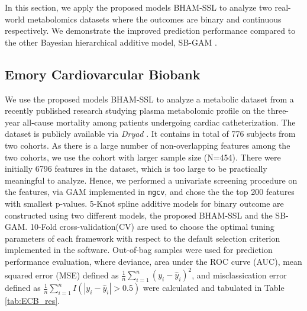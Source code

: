 \documentclass[AMA,STIX1COL,]{WileyNJD-v2}
\begin{document}
\label{sec:real_data}

In this section, we apply the proposed models BHAM-SSL to analyze two
real-world metabolomics datasets where the outcomes are binary and
continuous respectively. We demonstrate the improved prediction
performance compared to the other Bayesian hierarchical additive model,
SB-GAM \citep{Bai2021}.

\hypertarget{emory-cardiovarcular-biobank}{%
\subsection{Emory Cardiovarcular
Biobank}\label{emory-cardiovarcular-biobank}}

We use the proposed models BHAM-SSL to analyze a metabolic dataset from
a recently published research \citep{Mehta2020} studying plasma
metabolomic profile on the three-year all-cause mortality among patients
undergoing cardiac catheterization. The dataset is publicly available
via \textit{Dryad} \citep{Mehta2020_data}. It contains in total of 776
subjects from two cohorts. As there is a large number of non-overlapping
features among the two cohorts, we use the cohort with larger sample
size (N=454). There were initially 6796 features in the dataset, which
is too large to be practically meaningful to analyze. Hence, we
performed a univariate screening procedure on the features, via GAM
implemented in \texttt{mgcv}, and chose the the top 200 features with
smallest p-values. 5-Knot spline additive models for binary outcome are
constructed using two different models, the proposed BHAM-SSL and the
SB-GAM. 10-Fold cross-validation(CV) are used to choose the optimal
tuning parameters of each framework with respect to the default
selection criterion implemented in the software. Out-of-bag samples were
used for prediction performance evaluation, where deviance, area under
the ROC curve (AUC), mean squared error (MSE) defined as
\(\frac{1}{n}\sum\limits^{n}_{i=1}(y_i - \hat y_i)^2\), and
misclassication error defined as
\(\frac{1}{n}\sum\limits^{n}_{i=1}I(|y_i - \hat y_i|>0.5)\) were
calculated and tabulated in Table \ref{tab:ECB_res}.

\providecommand{\docline}[3]{\noalign{\global\setlength{\arrayrulewidth}{#1}}\arrayrulecolor[HTML]{#2}\cline{#3}}

\setlength{\tabcolsep}{2pt}

\renewcommand*{\arraystretch}{1.5}
\end{document}
